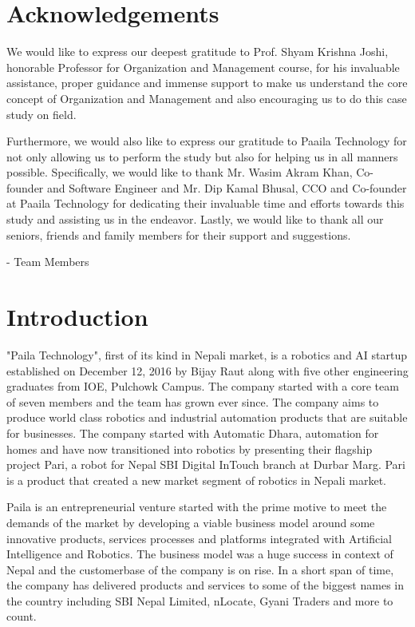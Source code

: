 \documentclass[12pt,a4paper]{scrreprt}
\begin{document}

\chapter*{Acknowledgements}
\thispagestyle{empty}
We would like to express our deepest gratitude to Prof. Shyam Krishna Joshi, honorable Professor for Organization and Management course, for his invaluable assistance, proper guidance and immense support to make us understand the core concept of Organization and Management and also encouraging us to do this case study on field.

Furthermore, we would also like to express our gratitude to Paaila Technology for not only allowing us to perform the study but also for helping us in all manners possible. Specifically, we would like to thank Mr. Wasim Akram Khan, Co-founder and Software Engineer and Mr. Dip Kamal Bhusal, CCO and Co-founder at Paaila Technology for dedicating their invaluable time and efforts towards this study and assisting us in the endeavor. Lastly, we would like to thank all our seniors, friends and family members for their support and suggestions.

- Team Members

\clearpage
\tableofcontents
\listoffigures
\clearpage
{}

\chapter{Introduction}
"Paila Technology", first of its kind in Nepali market, is a robotics and AI startup established on December 12, 2016 by Bijay Raut along with five other engineering graduates from IOE, Pulchowk Campus. The company started with a core team of seven members and the team has grown ever since. The company aims to produce world class robotics and industrial automation products that are suitable for businesses.
The company started with Automatic Dhara, automation for homes and have now transitioned into robotics by presenting their flagship project Pari, a robot for Nepal SBI Digital InTouch branch at Durbar Marg. Pari is a product that created a new market segment of robotics in Nepali market.

Paila is an entrepreneurial venture started with the prime motive to meet the demands of the market by developing a viable business model around some innovative products, services processes and platforms integrated with Artificial Intelligence and Robotics. The business model was a huge success in context of Nepal and the customerbase of the company is on rise. In a short span of time, the company has delivered products and services to some of the biggest names in the country including SBI Nepal Limited, nLocate, Gyani Traders and more to count.
\end{document}
